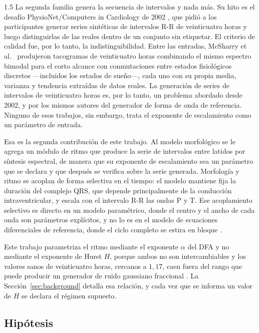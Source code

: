 \begin{spacing}{1.5}
La segunda familia genera la secuencia de intervalos y nada más. Su hito es el desafío PhysioNet/Computers in Cardiology de 2002 \cite{moody2002challenge}, que pidió a los participantes generar series sintéticas de intervalos R-R de veinticuatro horas y luego distinguirlas de las reales dentro de un conjunto sin etiquetar. El criterio de calidad fue, por lo tanto, la indistinguibilidad. Entre las entradas, McSharry et al.\ \cite{mcsharry2002tachogram} produjeron tacogramas de veinticuatro horas combinando el mismo espectro bimodal para el corto alcance con conmutaciones entre estados fisiológicos discretos —incluidos los estados de sueño—, cada uno con su propia media, varianza y tendencia extraídas de datos reales. La generación de series de intervalos de veinticuatro horas es, por lo tanto, un problema abordado desde 2002, y por los mismos autores del generador de forma de onda de referencia. Ninguno de esos trabajos, sin embargo, trata el exponente de escalamiento como un parámetro de entrada.

Esa es la segunda contribución de este trabajo. Al modelo morfológico se le agrega un módulo de ritmo que produce la serie de intervalos entre latidos por síntesis espectral, de manera que su exponente de escalamiento sea un parámetro que se declara y que después se verifica sobre la serie generada. Morfología y ritmo se acoplan de forma selectiva en el tiempo: el modelo mantiene fija la duración del complejo QRS, que depende principalmente de la conducción intraventricular, y escala con el intervalo R-R las ondas P y T. Ese acoplamiento selectivo es directo en un modelo paramétrico, donde el centro y el ancho de cada onda son parámetros explícitos, y no lo es en el modelo de ecuaciones diferenciales de referencia, donde el ciclo completo se estira en bloque \cite{mcsharry2003dynamical}.

Este trabajo parametriza el ritmo mediante el exponente $\alpha$ del DFA y no mediante el exponente de Hurst $H$, porque ambos no son intercambiables y los valores sanos de veinticuatro horas, cercanos a $1{,}17$, caen fuera del rango que puede producir un generador de ruido gaussiano fraccional \cite{hardstone2012dfa}. La Sección~\ref{sec:background} detalla esa relación, y cada vez que se informa un valor de $H$ se declara el régimen supuesto.

\subsection{Hipótesis}


\end{spacing}
